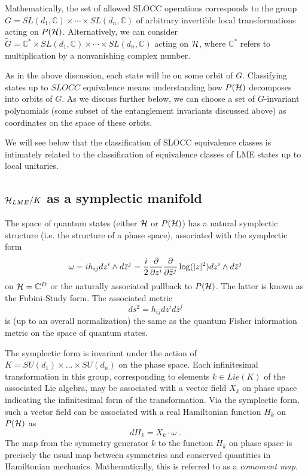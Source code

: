 \documentclass[12pt]{article}
\theoremstyle{definition}
\newcommand{\be}{\begin{equation}}
\newcommand{\ee}{\end{equation}}
\begin{document}
Mathematically, the set of allowed SLOCC operations corresponds to the group $G = SL(d_1, \mathbb{C}) \times \cdots \times SL(d_n, \mathbb{C})$ of arbitrary invertible local transformations acting on $P({\cal H})$. Alternatively, we can consider $\tilde{G} = \mathbb{C}^* \times SL(d_1, \mathbb{C}) \times \cdots \times SL(d_n, \mathbb{C})$ acting on ${\cal H}$, where $\mathbb{C}^*$ refers to multiplication by a nonvanishing complex number.

As in the above discussion, each state will be on some orbit of $G$. Classifying states up to $SLOCC$ equivalence means understanding how $P({\cal H})$ decomposes into orbits of $G$. As we discuss further below, we can choose a set of $G$-invariant polynomials (some subset of the entanglement invariants discussed above) as coordinates on the space of these orbits.

We will see below that the classification of SLOCC equivalence classes is intimately related to the classification of equivalence classes of LME states up to local unitaries.

\subsection{${\cal H}_{LME}/K$ as a symplectic manifold}

The space of quantum states (either ${\cal H}$ or $P({\cal H})$) has a natural symplectic structure (i.e. the structure of a phase space), associated with the symplectic form
\be
\omega = i h_{ij} dz^{i} \wedge  d\bar{z}^j =  {i \over 2} {\partial \over \partial z^i} {\partial \over \partial \bar{z}^j} \log (|z|^2) dz^{i} \wedge  d\bar{z}^j
\ee
on ${\cal H} = \mathbb{C}^D$ or the naturally associated pullback to $P({\cal H})$. The latter is known as the Fubini-Study form. The associated metric
\be
ds^2 = h_{ij} dz^i d \bar{z}^j
\ee
is (up to an overall normalization) the same as the quantum Fisher information metric on the space of quantum states.

The symplectic form is invariant under the action of $K = SU(d_1) \times \dots \times SU(d_n)$ on the phase space. Each infinitesimal transformation  in this group, corresponding to elements $k \in Lie(K)$ of the associated Lie algebra, may be associated with a vector field $X_k$ on phase space indicating the infinitesimal form of the transformation. Via the symplectic form, such a vector field can be associated with a real Hamiltonian function $H_k$ on $P({\cal H})$ as
\be
d H_k = {X_k} \cdot \omega \; .
\ee
The map from the symmetry generator $k$ to the function $H_k$ on phase space is precisely the usual map between symmetries and conserved quantities in Hamiltonian mechanics. Mathematically, this is referred to as a {\it comoment map}.
\end{document}
